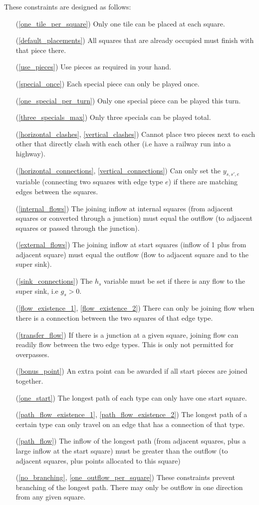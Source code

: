 \documentclass[11pt,a4paper]{article}
\begin{document}
These constraints are designed as follows:
\begin{itemize}
\item[(\ref{one_tile_per_square})] Only one tile can be placed at each square.
\item[(\ref{default_placements})] All squares that are already occupied must finish with that piece there.
\item[(\ref{use_pieces})] Use pieces as required in your hand.
\item[(\ref{special_once})] Each special piece can only be played once.
\item[(\ref{one_special_per_turn})] Only one special piece can be played this turn.
\item[(\ref{three_specials_max})] Only three specials can be played total.
\item[(\ref{horizontal_clashes}, \ref{vertical_clashes})] Cannot place two pieces next to each other that directly clash with each other (i.e have a railway run into a highway).
\item[(\ref{horizontal_connections}, \ref{vertical_connections})] Can only set the $y_{s,s',e}$ variable (connecting two squares with edge type $e$) if there are matching edges between the squares.
\item[(\ref{internal_flows})] The joining inflow at internal squares (from adjacent squares or converted through a junction) must equal the outflow (to adjacent squares or passed through the junction).
\item[(\ref{external_flows})] The joining inflow at start squares (inflow of 1 plus from adjacent square) must equal the outflow (flow to adjacent square and to the super sink).
\item[(\ref{sink_connections})] The $h_s$ variable must be set if there is any flow to the super sink, i.e $g_s > 0$.
\item[(\ref{flow_existence_1}, \ref{flow_existence_2})] There can only be joining flow when there is a connection between the two squares of that edge type.
\item[(\ref{transfer_flow})] If there is a junction at a given square, joining flow can readily flow between the two edge types. 
This is only not permitted for overpasses.
\item[(\ref{bonus_point})] An extra point can be awarded if all start pieces are joined together.
\item[(\ref{one_start})] The longest path of each type can only have one start square.
\item[(\ref{path_flow_existence_1}, \ref{path_flow_existence_2})] The longest path of a certain type can only travel on an edge that has a connection of that type. 
\item[(\ref{path_flow})] The inflow of the longest path (from adjacent squares, plus a large inflow at the start square) must be greater than the outflow (to adjacent squares, plus points allocated to this square)
\item[(\ref{no_branching}, \ref{one_outflow_per_square})] These constraints prevent branching of the longest path. 
There may only be outflow in one direction from any given square.
\end{itemize}
\end{document}
